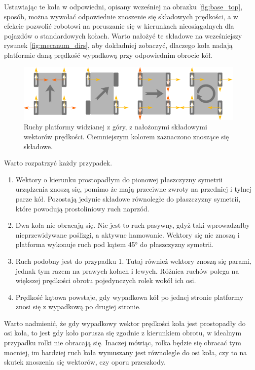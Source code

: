 	Ustawiając te koła w odpowiedni, opisany wcześniej na obrazku \ref{fig:base_top}, sposób, można wywołać odpowiednie znoszenie się składowych prędkości,
	a w efekcie pozwolić robotowi na poruszanie się w kierunkach nieosiągalnych dla pojazdów o standardowych kołach.
	Warto nałożyć te składowe na wcześniejszy rysunek \ref{fig:mecanum_dirs}, aby dokładniej zobaczyć, 
	dlaczego koła nadają platformie daną prędkość wypadkową przy odpowiednim obrocie kół.

	\begin{figure}[H]
	\centering
	\includegraphics[width=\textwidth]{graphics/mecanum_dirs_vect.pdf}
	\caption{Ruchy platformy widzianej z góry, z nałożonymi składowymi wektorów prędkości. Ciemniejszym kolorem zaznaczono znoszące się składowe.}
	\label{fig:mecanum_dirs_vect}
	\end{figure} 

	Warto rozpatrzyć każdy przypadek.
	\begin{enumerate}
		\item Wektory o kierunku prostopadłym do pionowej płaszczyzny symetrii urządzenia znoszą się, pomimo że mają przeciwne zwroty na przedniej i tylnej parze kół.
		Pozostają jedynie składowe równoległe do płaszczyzny symetrii, które powodują prostoliniowy ruch naprzód.
		\item Dwa koła nie obracają się. Nie jest to ruch pasywny, gdyż taki wprowadzałby nieprzewidywane poślizgi, a aktywne hamowanie.
		Wektory się nie znoszą i platforma wykonuje ruch pod kątem 45° do płaszczyzny symetrii.
		\item Ruch podobny jest do przypadku 1. Tutaj również wektory znoszą się parami, jednak tym razem na prawych kołach i lewych. 
		Różnica ruchów polega na większej prędkości obrotu pojedynczych rolek wokół ich osi.
		\item Prędkość kątowa powstaje, gdy wypadkowa kół po jednej stronie platformy znosi się z wypadkową po drugiej stronie.
	\end{enumerate}

	Warto nadmienić, że gdy wypadkowy wektor prędkości koła jest prostopadły do osi koła, to jest gdy
	koło porusza się zgodnie z kierunkiem obrotu, w idealnym przypadku rolki nie obracają się.
	Inaczej mówiąc, rolka będzie się obracać tym mocniej, im bardziej ruch koła wymuszany jest równolegle do osi koła, 
	czy to na skutek znoszenia się wektorów, czy oporu przeszkody.
	
